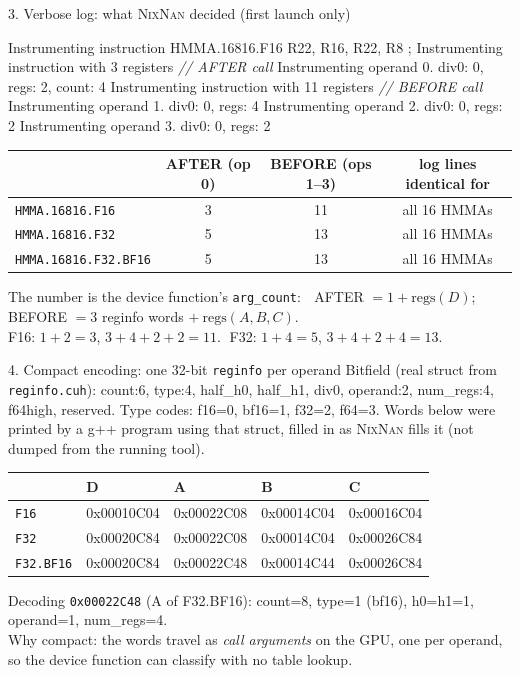 \documentclass[aspectratio=169,10pt]{beamer}
\newcommand{\nn}{\textsc{NixNan}}
\newcommand{\tx}[1]{\texttt{\small #1}}
\begin{document}
\begin{frame}[fragile]{3. Verbose log: what \nn{} decided (first launch only)}
\scriptsize
\begin{semiverbatim}
Instrumenting instruction HMMA.16816.F16 R22, R16, R22, R8 ;
Instrumenting instruction with 3 registers          \textit{// AFTER call}
Instrumenting operand 0. div0: 0, regs: 2, count: 4
Instrumenting instruction with 11 registers         \textit{// BEFORE call}
Instrumenting operand 1. div0: 0, regs: 4
Instrumenting operand 2. div0: 0, regs: 2
Instrumenting operand 3. div0: 0, regs: 2
\end{semiverbatim}
\vspace{-1mm}
\footnotesize
\begin{tabular}{@{}l c c c@{}}
\toprule
 & AFTER (op 0) & BEFORE (ops 1--3) & log lines identical for\\
\midrule
\tx{HMMA.16816.F16} & 3 & 11 & all 16 HMMAs\\
\tx{HMMA.16816.F32} & 5 & 13 & all 16 HMMAs\\
\tx{HMMA.16816.F32.BF16} & 5 & 13 & all 16 HMMAs\\
\bottomrule
\end{tabular}

\smallskip
The number is the device function's \tx{arg\_count}: $\;$ AFTER $=1+\mathrm{regs}(D)$; BEFORE $=3$ reginfo words $+\ \mathrm{regs}(A,B,C)$.\\
F16: $1+2=3$, $3+4+2+2=11$. $\;$F32: $1+4=5$, $3+4+2+4=13$.
\end{frame}

\begin{frame}[fragile]{4. Compact encoding: one 32-bit \tx{reginfo} per operand}
\footnotesize
Bitfield (real struct from \tx{reginfo.cuh}): count:6, type:4, half\_h0, half\_h1, div0, operand:2, num\_regs:4, f64high, reserved.
Type codes: f16=0, bf16=1, f32=2, f64=3. Words below were printed by a g++ program using that struct, filled in as \nn{} fills it (not dumped from the running tool).
\medskip
\centering\scriptsize
\begin{tabular}{@{}l l l l l@{}}
\toprule
 & D & A & B & C\\
\midrule
\tx{F16} & 0x00010C04 & 0x00022C08 & 0x00014C04 & 0x00016C04\\
\tx{F32} & 0x00020C84 & 0x00022C08 & 0x00014C04 & 0x00026C84\\
\tx{F32.BF16} & 0x00020C84 & 0x00022C48 & 0x00014C44 & 0x00026C84\\
\bottomrule
\end{tabular}
\medskip

\raggedright\footnotesize
Decoding \tx{0x00022C48} (A of F32.BF16): count=8, type=1 (bf16), h0=h1=1, operand=1, num\_regs=4.\\
Why compact: the words travel as \emph{call arguments} on the GPU, one per operand, so the device function can classify with no table lookup.
\end{frame}
\end{document}
